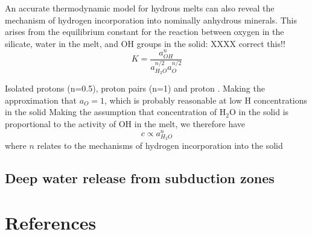 \documentclass[review]{elsarticle}
\begin{document}
An accurate thermodynamic model for hydrous melts can also reveal the mechanism of hydrogen incorporation into nominally anhydrous minerals. This arises from the equilibrium constant for the reaction between oxygen in the silicate, water in the melt, and OH groups in the solid: XXXX correct this!!
\begin{equation}
  K = \frac{a_{OH}^n}{a_{H_2O}^{n/2}a_O^{n/2}}
\end{equation}

Isolated protons (n=0.5), proton pairs (n=1) and proton . Making the approximation that $a_O = 1$, which is probably reasonable at low H concentrations in the solid 
Making the assumption that concentration of H$_2$O in the solid is proportional to the activity of OH in the melt, we therefore have
\begin{equation}
  c \propto a_{H_2O}^n
\end{equation}
where $n$ relates to the mechanisms of hydrogen incorporation into the solid \citep{KB2006}

\subsection{Deep water release from subduction zones}
\cite{MF2010}
\cite{BK2003}
\cite{MSK2008}







\clearpage
\section*{References}


\end{document}
